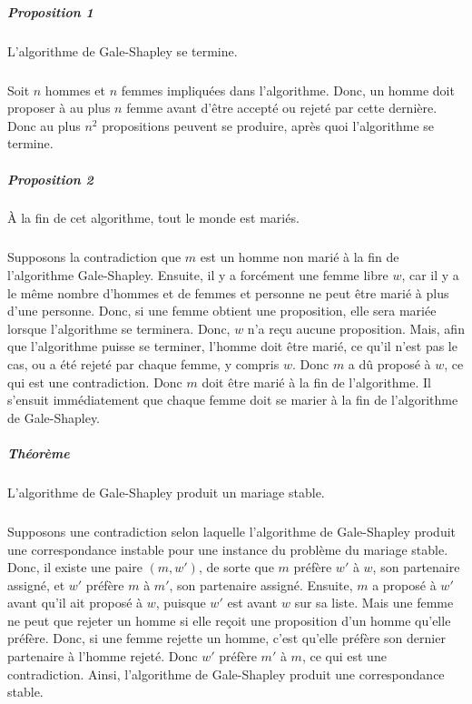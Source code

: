 \documentclass[11pt]{article}
\begin{document}
\subparagraph{Proposition 1}
L'algorithme de Gale-Shapley se termine.
\subparagraph{}
Soit $n$ hommes et $n$ femmes impliqu\'ees dans l'algorithme. Donc, un homme
doit proposer \`a au plus $n$ femme avant d'\^etre accept\'e ou rejet\'e par
cette derni\`ere.
Donc au plus $n^2$ propositions peuvent se produire, apr\`es quoi l'algorithme
se termine.

\subparagraph{Proposition 2}
\`A la fin de cet algorithme, tout le monde est mari\'es.
\subparagraph{}
Supposons la contradiction que $m$ est un homme non mari\'e \`a la fin de
l'algorithme Gale-Shapley. Ensuite, il y a forc\'ement une femme libre $w$,
car il y a le m\^eme nombre d'hommes et de femmes et personne ne peut \^etre
mari\'e \`a plus d'une personne. Donc, si une femme obtient une
proposition, elle sera mari\'ee lorsque l'algorithme se terminera.
Donc, $w$ n'a re\c{c}u aucune proposition. Mais, afin que l'algorithme puisse
se terminer, l'homme doit \^etre mari\'e, ce qu'il n'est pas le cas,
ou a \'et\'e rejet\'e par chaque femme, y compris $w$. Donc $m$ a d\^u
propos\'e \`a $w$, ce qui est une contradiction. Donc $m$ doit \^etre mari\'e
\`a la fin de l'algorithme. Il s'ensuit immédiatement que chaque femme doit se
marier \`a la fin de l'algorithme de Gale-Shapley.

\subparagraph{Th\'eor\`eme}
L'algorithme de Gale-Shapley produit un mariage stable.
\subparagraph{}
Supposons une contradiction selon laquelle l'algorithme de Gale-Shapley produit
une correspondance instable pour une instance du probl\`eme du mariage stable. 
Donc, il existe une paire $(m, w')$, de sorte que $m$ pr\'ef\`ere $w'$ \`a $w$, 
son partenaire assign\'e, et $w'$ pr\'ef\`ere $m$ \`a $m'$, 
son partenaire assign\'e. Ensuite, $m$ a propos\'e \`a $w'$ avant qu'il ait
propos\'e \`a $w$, puisque $w'$ est avant $w$ sur sa liste. Mais une femme ne
peut que rejeter un homme si elle re\c{c}oit une proposition d'un homme qu'elle
pr\'ef\`ere.
Donc, si une femme rejette un homme, c'est qu'elle pr\'ef\`ere son dernier
partenaire \`a l'homme rejet\'e.
Donc $w'$ pr\'ef\`ere $m'$ \`a $m$, ce qui est une contradiction. 
Ainsi, l'algorithme de Gale-Shapley produit une correspondance stable.
\end{document}

